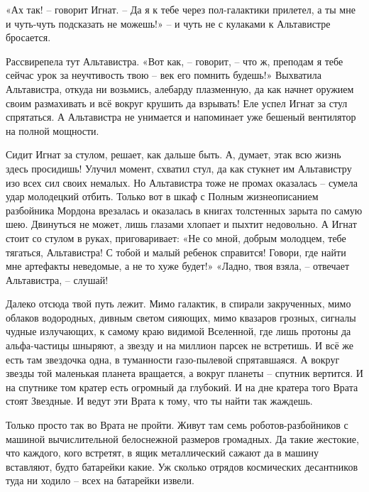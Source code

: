 \documentclass[ebook,oneside,final,openright]{memoir}
\begin{document}
\par
«Ах так! – говорит Игнат. – Да я к тебе через пол-галактики прилетел, а ты мне и чуть-чуть подсказать не можешь!» – и чуть не с кулаками к Альтавистре бросается. \par
\par
Рассвирепела тут Альтавистра. «Вот как, – говорит, – что ж, преподам я тебе сейчас урок за неучтивость твою – век его помнить будешь!» Выхватила Альтавистра, откуда ни возьмись, алебарду плазменную, да как начнет оружием своим размахивать и всё вокруг крушить да взрывать! Еле успел Игнат за стул спрятаться. А Альтавистра не унимается и напоминает уже бешеный вентилятор на полной мощности. \par
\par
Сидит Игнат за стулом, решает, как дальше быть. А, думает, этак всю жизнь здесь просидишь! Улучил момент, схватил стул, да как стукнет им Альтавистру изо всех сил своих немалых. Но Альтавистра тоже не промах оказалась – сумела удар молодецкий отбить. Только вот в шкаф с Полным жизнеописанием разбойника Мордона врезалась и оказалась в книгах толстенных зарыта по самую шею. Двинуться не может, лишь глазами хлопает и пыхтит недовольно. А Игнат стоит со стулом в руках, приговаривает: «Не со мной, добрым молодцем, тебе тягаться, Альтавистра! С тобой и малый ребенок справится! Говори, где найти мне артефакты неведомые, а не то хуже будет!» «Ладно, твоя взяла, – отвечает Альтавистра, – слушай!\par
\par
Далеко отсюда твой путь лежит. Мимо галактик, в спирали закрученных, мимо облаков водородных, дивным светом сияющих, мимо квазаров грозных, сигналы чудные излучающих, к самому краю видимой Вселенной, где лишь протоны да альфа-частицы шныряют, а звезду и на миллион парсек не встретишь. И всё же есть там звездочка одна, в туманности газо-пылевой спрятавшаяся. А вокруг звезды той маленькая планета вращается, а вокруг планеты – спутник вертится. И на спутнике том кратер есть огромный да глубокий. И на дне кратера того Врата стоят Звездные. И ведут эти Врата к тому, что ты найти так жаждешь.\par
\par
Только просто так во Врата не пройти. Живут там семь роботов-разбойников с машиной вычислительной белоснежной размеров громадных. Да такие жестокие, что каждого, кого встретят, в ящик металлический сажают да в машину вставляют, будто батарейки какие. Уж сколько отрядов космических десантников туда ни ходило – всех на батарейки извели.\par
\end{document}
